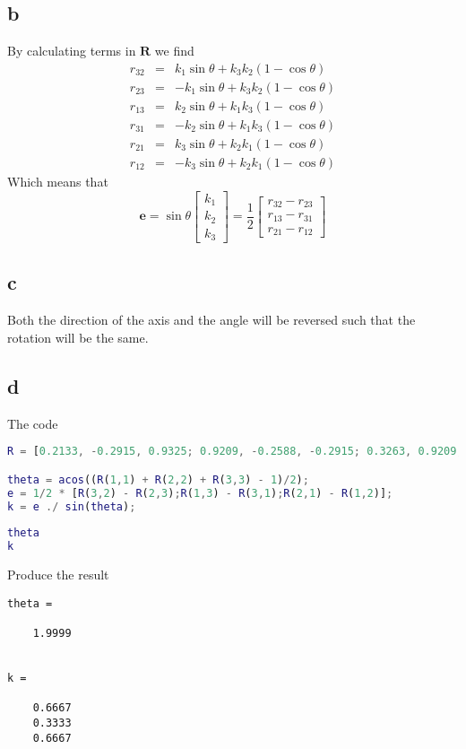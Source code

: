 \documentclass[11pt]{article}
\begin{document}
\subsection*{b}
By calculating terms in $\mathbf{R}$ we find
\begin{eqnarray*}
r_{32} &=&  k_1 \sin{\theta} + k_3 k_2 (1 - \cos{\theta}) \\
r_{23} &=& -k_1 \sin{\theta} + k_3 k_2 (1 - \cos{\theta}) \\
r_{13} &=&  k_2 \sin{\theta} + k_1 k_3 (1 - \cos{\theta}) \\
r_{31} &=& -k_2 \sin{\theta} + k_1 k_3 (1 - \cos{\theta}) \\
r_{21} &=&  k_3 \sin{\theta} + k_2 k_1 (1 - \cos{\theta}) \\
r_{12} &=& -k_3 \sin{\theta} + k_2 k_1 (1 - \cos{\theta})
\end{eqnarray*}
Which means that
\[\mathbf{e} = 
\sin{\theta} 
\begin{bmatrix}
k_1 \\
k_2 \\
k_3
\end{bmatrix}
=
\frac{1}{2}
\begin{bmatrix}
r_{32} - r_{23} \\
r_{13} - r_{31} \\
r_{21} - r_{12}
\end{bmatrix}
\]


\subsection*{c}
Both the direction of the axis and the angle will be reversed such that the rotation will be the same.

\subsection*{d}
The code
\begin{lstlisting}[language=Matlab,breaklines=true]
R = [0.2133, -0.2915, 0.9325; 0.9209, -0.2588, -0.2915; 0.3263, 0.9209, 0.2133];

theta = acos((R(1,1) + R(2,2) + R(3,3) - 1)/2);
e = 1/2 * [R(3,2) - R(2,3);R(1,3) - R(3,1);R(2,1) - R(1,2)];
k = e ./ sin(theta);
    
theta
k
\end{lstlisting}
Produce the result
\begin{lstlisting}
theta =

    1.9999


k =

    0.6667
    0.3333
    0.6667
\end{lstlisting}
\end{document}
